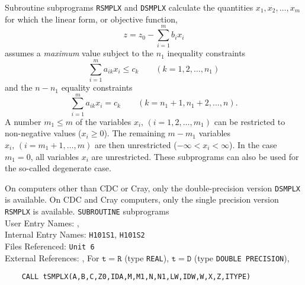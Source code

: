                            
                
                     
Subroutine subprograms {\tt RSMPLX} and {\tt DSMPLX}
calculate the quantities
$x_1,x_2,\ldots,x_m$ for which the linear form, or objective function,
$$z = z_0 - \sum_{i=1}^m b_i x_i$$
assumes a {\it maximum} value subject to the $n_1$ inequality
constraints
$$ \sum ^m_{i=1} a_{ik}x_i \le c_k \qquad  (k = 1,2,\ldots,n_1)$$
and the $n-n_1$ equality constraints
$$ \sum^m_{i=1}a_{ik} x_i = c_k \qquad (k = n_1+1,n_1+2,\ldots,n).$$
A number $m_1 \le m$ of the variables $x_i,\,(i=1,2,\ldots,m_1)$
can be restricted to non-negative values ($x_i \ge 0$). The remaining
$m-m_1$ variables $x_i,\,(i=m_1+1,\ldots,m)$ are then unrestricted
($-\infty <x_i<\infty$). In the case $m_1=0$, all variables $x_i$
are unrestricted. These subprograms can also be used for the so-called
degenerate case.
\par
On computers other than CDC or Cray, only the double-precision
version {\tt DSMPLX} is available. On CDC and Cray computers,
only the single precision version {\tt RSMPLX} is available.
\Structure
{\tt SUBROUTINE} subprograms \\
User Entry Names: ,  \\
Internal Entry Names: {\tt H101S1}, {\tt H101S2} \\
Files  Referenced:  {\tt Unit 6} \\
External References: , 
\Usage
For $\mathtt{t=R}$ (type {\tt REAL}), $\mathtt{t=D}$ (type
{\tt DOUBLE PRECISION}),
\begin{verbatim}
    CALL tSMPLX(A,B,C,Z0,IDA,M,M1,N,N1,LW,IDW,W,X,Z,ITYPE)
\end{verbatim}
